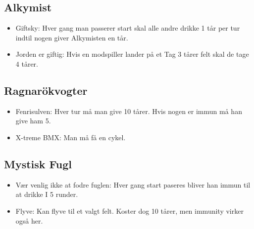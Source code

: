 \documentclass{article}
\begin{document}
\subsection{Alkymist}
\begin{itemize}
	\item Giftsky: Hver gang man passerer start skal alle andre drikke 1 tår per tur indtil nogen giver Alkymisten en tår.
	\item Jorden er giftig: Hvis en modspiller lander på et Tag 3 tårer felt skal de tage 4 tårer.
\end{itemize}
 
\subsection{Ragnarökvogter}
\begin{itemize}
	\item Fenrisulven: Hver tur må man give 10 tårer. Hvis nogen er immun må han give ham 5.
	\item X-treme BMX: Man må få en cykel.
\end{itemize}
 
\subsection{Mystisk Fugl}
\begin{itemize}
	\item Vær venlig ikke at fodre fuglen: Hver gang start paseres bliver han immun til at drikke I 5 runder.
	\item Flyve: Kan flyve til et valgt felt. Koster dog 10 tårer, men immunity virker også her.
\end{itemize}
\end{document}
